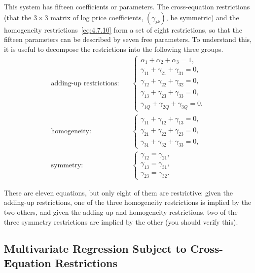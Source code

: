 This system has fifteen coefficients or parameters. The cross-equation restrictions
(that the $3 \times 3$ matrix of log price coefficients, $(\gamma_{jk})$, be symmetric)
and the homogeneity restrictions~\eqref{eq:4.7.10} form a set of eight restrictions,
so that the fifteen parameters can be described by seven free parameters.
To understand this, it is useful to decompose the restrictions into the following three groups.
\begin{align}
\text{adding-up restrictions:} \quad &
\begin{cases}
\alpha_1 + \alpha_2 + \alpha_3 = 1, \\
\gamma_{11} + \gamma_{21} + \gamma_{31} = 0, \\
\gamma_{12} + \gamma_{22} + \gamma_{32} = 0, \\
\gamma_{13} + \gamma_{23} + \gamma_{33} = 0, \\
\gamma_{1Q} + \gamma_{2Q} + \gamma_{3Q} = 0.
\end{cases}
\label{eq:4.7.12} \\[6pt]
\text{homogeneity:} \quad &
\begin{cases}
\gamma_{11} + \gamma_{12} + \gamma_{13} = 0, \\
\gamma_{21} + \gamma_{22} + \gamma_{23} = 0, \\
\gamma_{31} + \gamma_{32} + \gamma_{33} = 0,
\end{cases}
\label{eq:4.7.13} \\[6pt]
\text{symmetry:} \quad &
\begin{cases}
\gamma_{12} = \gamma_{21}, \\
\gamma_{13} = \gamma_{31}, \\
\gamma_{23} = \gamma_{32}.
\end{cases}
\label{eq:4.7.14}
\end{align}

These are eleven equations, but only eight of them are restrictive: given the
adding-up restrictions, one of the three homogeneity restrictions is implied by
the two others, and given the adding-up and homogeneity restrictions, two of the
three symmetry restrictions are implied by the other (you should verify this).

\subsection*{Multivariate Regression Subject to Cross-Equation Restrictions}

